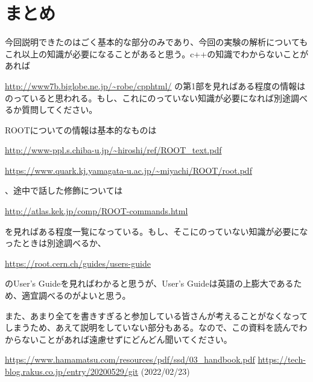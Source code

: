 \documentclass[uplatex,10pt,a4j]{jsarticle}
\begin{document}
\section{まとめ}
\label{sec:lastsection}
今回説明できたのはごく基本的な部分のみであり、今回の実験の解析についてもこれ以上の知識が必要になることがあると思う。c++の知識でわからないことがあれば

\url{http://www7b.biglobe.ne.jp/~robe/cpphtml/}
の第1部を見ればある程度の情報はのっていると思われる。もし、これにのっていない知識が必要になれば別途調べるか質問してください。

ROOTについての情報は基本的なものは

\url{http://www-ppl.s.chiba-u.jp/~hiroshi/ref/ROOT_text.pdf}

\url{https://www.quark.kj.yamagata-u.ac.jp/~miyachi/ROOT/root.pdf}

、途中で話した修飾については

\url{http://atlas.kek.jp/comp/ROOT-commands.html}

を見ればある程度一覧になっている。もし、そこにのっていない知識が必要になったときは別途調べるか、

\url{https://root.cern.ch/guides/users-guide}

のUser's Guideを見ればわかると思うが、User's Guideは英語の上膨大であるため、適宜調べるのがよいと思う。

また、あまり全てを書きすぎると参加している皆さんが考えることがなくなってしまうため、あえて説明をしていない部分もある。なので、この資料を読んでわからないことがあれば遠慮せずにどんどん聞いてください。

\begin{thebibliography}{9}
  \url{https://www.hamamatsu.com/resources/pdf/ssd/03_handbook.pdf}
  \url{https://tech-blog.rakus.co.jp/entry/20200529/git} (2022/02/23)
\end{thebibliography}
\end{document}
